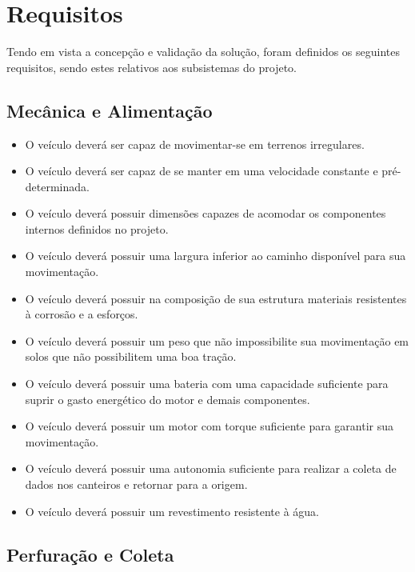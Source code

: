 \chapter{Requisitos}

  Tendo em vista a concepção e validação da solução, foram definidos os seguintes
  requisitos, sendo estes relativos aos subsistemas do projeto.

  \section{Mecânica e Alimentação}

    \begin{itemize}
      \item O veículo deverá ser capaz de movimentar-se em terrenos irregulares.
      \item O veículo deverá ser capaz de se manter em uma velocidade constante e pré-determinada.
      \item O veículo deverá possuir dimensões capazes de acomodar os componentes internos definidos no projeto.
      \item O veículo deverá possuir uma largura inferior ao caminho disponível para sua movimentação.
      \item O veículo deverá possuir na composição de sua estrutura materiais resistentes à corrosão e a esforços.
      \item O veículo deverá possuir um peso que não impossibilite sua movimentação em solos que não possibilitem uma boa tração.
      \item O veículo deverá possuir uma bateria com uma capacidade suficiente para suprir o gasto energético do motor e demais componentes.
      \item O veículo deverá possuir um motor com torque suficiente para garantir sua movimentação.
      \item O veículo deverá possuir uma autonomia suficiente para realizar a coleta de dados nos canteiros e retornar para a origem.
      \item O veículo deverá possuir um revestimento resistente à água.
    \end{itemize}

\vfill
\pagebreak

  \section{Perfuração e Coleta}

